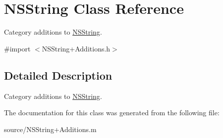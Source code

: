 \hypertarget{class_n_s_string}{
\section{NSString Class Reference}
\label{class_n_s_string}
}


Category additions to \hyperlink{class_n_s_string}{NSString}.  


{\ttfamily \#import $<$NSString+Additions.h$>$}

\subsection{Detailed Description}
Category additions to \hyperlink{class_n_s_string}{NSString}. 

The documentation for this class was generated from the following file:\begin{DoxyCompactItemize}
\item 
source/NSString+Additions.m\end{DoxyCompactItemize}
